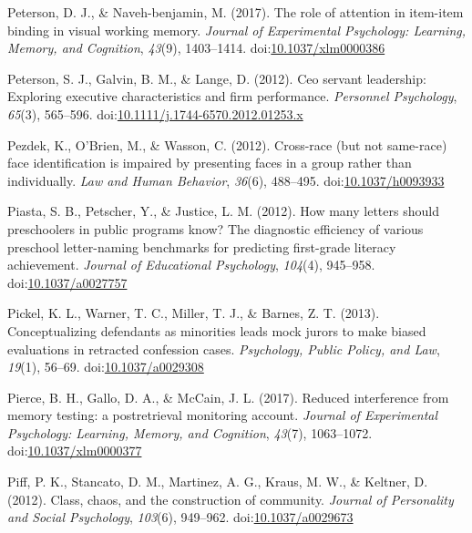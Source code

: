 \documentclass[english,man]{apa6}
\begin{document}
\hypertarget{ref-Peterson2017}{}
Peterson, D. J., \& Naveh-benjamin, M. (2017). The role of attention in
item-item binding in visual working memory. \emph{Journal of
Experimental Psychology: Learning, Memory, and Cognition}, \emph{43}(9),
1403--1414.
doi:\href{https://doi.org/10.1037/xlm0000386}{10.1037/xlm0000386}

\hypertarget{ref-Peterson2012a}{}
Peterson, S. J., Galvin, B. M., \& Lange, D. (2012). Ceo servant
leadership: Exploring executive characteristics and firm performance.
\emph{Personnel Psychology}, \emph{65}(3), 565--596.
doi:\href{https://doi.org/10.1111/j.1744-6570.2012.01253.x}{10.1111/j.1744-6570.2012.01253.x}

\hypertarget{ref-Pezdek2012}{}
Pezdek, K., O'Brien, M., \& Wasson, C. (2012). Cross-race (but not
same-race) face identification is impaired by presenting faces in a
group rather than individually. \emph{Law and Human Behavior},
\emph{36}(6), 488--495.
doi:\href{https://doi.org/10.1037/h0093933}{10.1037/h0093933}

\hypertarget{ref-Piasta2012}{}
Piasta, S. B., Petscher, Y., \& Justice, L. M. (2012). How many letters
should preschoolers in public programs know? The diagnostic efficiency
of various preschool letter-naming benchmarks for predicting first-grade
literacy achievement. \emph{Journal of Educational Psychology},
\emph{104}(4), 945--958.
doi:\href{https://doi.org/10.1037/a0027757}{10.1037/a0027757}

\hypertarget{ref-Pickel2013}{}
Pickel, K. L., Warner, T. C., Miller, T. J., \& Barnes, Z. T. (2013).
Conceptualizing defendants as minorities leads mock jurors to make
biased evaluations in retracted confession cases. \emph{Psychology,
Public Policy, and Law}, \emph{19}(1), 56--69.
doi:\href{https://doi.org/10.1037/a0029308}{10.1037/a0029308}

\hypertarget{ref-Pierce2017}{}
Pierce, B. H., Gallo, D. A., \& McCain, J. L. (2017). Reduced
interference from memory testing: a postretrieval monitoring account.
\emph{Journal of Experimental Psychology: Learning, Memory, and
Cognition}, \emph{43}(7), 1063--1072.
doi:\href{https://doi.org/10.1037/xlm0000377}{10.1037/xlm0000377}

\hypertarget{ref-Piff2012}{}
Piff, P. K., Stancato, D. M., Martinez, A. G., Kraus, M. W., \& Keltner,
D. (2012). Class, chaos, and the construction of community.
\emph{Journal of Personality and Social Psychology}, \emph{103}(6),
949--962. doi:\href{https://doi.org/10.1037/a0029673}{10.1037/a0029673}
\end{document}
